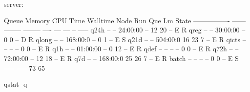 \begin{prompt}
server: %

Queue            Memory CPU Time Walltime Node  Run Que Lm  State
---------------- ------ -------- -------- ----  --- --- --  -----
q24h               --      --    24:00:00   --   12  20 --   E R
qreg               --      --    30:00:00   --    0   0 --   D R
qlong              --      --    168:00:0   --    0   1 --   E S
q21d               --      --    504:00:0    16  23   7 --   E R
qicts              --      --       --      --    0   0 --   E R
q1h                --      --    01:00:00   --    0  12 --   E R
qdef               --      --       --      --    0   0 --   E R
q72h               --      --    72:00:00   --   12  18 --   E R
q7d                --      --    168:00:0    25  26   7 --   E R
batch              --      --       --      --    0   0 --   E S
                                               ----- -----
                                                  73    65

\end{prompt}qstat -q
